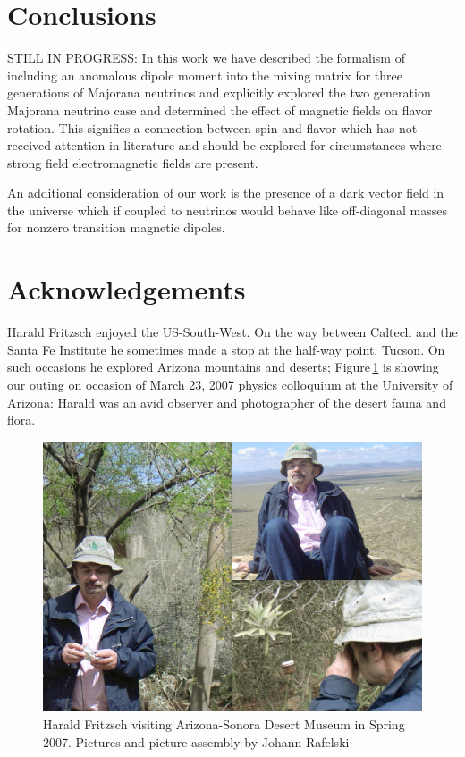 \documentclass[addchapnum]{ws-rv961x669} %
\begin{document}
\section{Conclusions}
STILL IN PROGRESS: In this work we have described the formalism of including an anomalous dipole moment into the mixing matrix for three generations of Majorana neutrinos and explicitly explored the two generation Majorana neutrino case and determined the effect of magnetic fields on flavor rotation. This signifies a connection between spin and flavor which has not received attention in literature and should be explored for circumstances where strong field electromagnetic fields are present.

An additional consideration of our work is the presence of a dark vector field in the universe which if coupled to neutrinos would behave like off-diagonal masses for nonzero transition magnetic dipoles.

\section*{Acknowledgements}
Harald Fritzsch enjoyed the US-South-West. On the way between Caltech and the Santa Fe Institute he sometimes made a stop at the half-way point, Tucson. On such occasions he explored Arizona mountains and  deserts; Figure\,\ref{Fig:AZcolloq2007} is showing our outing on occasion of March 23, 2007 physics colloquium at the University of Arizona: Harald was an avid observer and photographer of the desert fauna and flora. 
 
\begin{figure}%
\centerline{\includegraphics[width=0.95\columnwidth]{07March24HaraldCollageDesertMuseum.jpg}}
\caption{Harald Fritzsch visiting Arizona-Sonora Desert Museum in Spring 2007. Pictures and picture assembly by Johann Rafelski
}
\label{Fig:AZcolloq2007} 
\end{figure}
\end{document}
